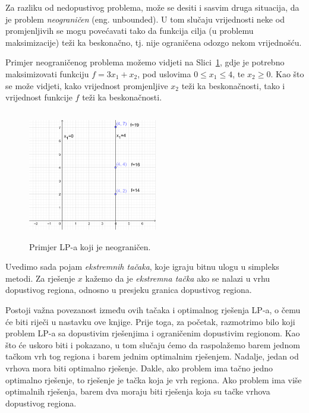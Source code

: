 \documentclass[a4paper, utf8, 11pt, colorlinks]{book}
\theoremstyle{definition}
\begin{document}
 Za razliku od nedopustivog problema, može se desiti i sasvim druga situacija, da je problem \emph{neograničen} (eng. unbounded). U tom slučaju vrijednosti neke od promjenljivih se mogu povećavati tako da funkcija cilja (u problemu maksimizacije) teži ka beskonačno, tj. nije ograničena odozgo nekom vrijednošću. %
 
 Primjer neograničenog problema možemo vidjeti na Slici~\ref{fig:unbounded_solution}, gdje je potrebno maksimizovati funkciju $f = 3 x_1 + x_2$, pod uslovima $0\leq x_1 \leq 4$, te $x_2 \geq 0$. Kao što se može vidjeti,  kako vrijednost promjenljive $x_2$ teži ka beskonačnosti, tako i vrijednost funkcije $f$ teži ka beskonačnosti.
 
  \begin{figure}
     \centering
     \includegraphics[width=160pt, height=160pt]{fig4.eps}
     \caption{Primjer LP-a koji je neograničen.}
     \label{fig:unbounded_solution}
 \end{figure}
 
Uvedimo sada pojam \emph{ekstremnih tačaka}, koje igraju bitnu ulogu u simpleks metodi. Za rješenje $x$ kažemo da je \emph{ekstremna tačka} ako se nalazi u vrhu dopustivog regiona, odnosno u presjeku granica dopustivog regiona.

Postoji važna povezanost između ovih tačaka i optimalnog rješenja LP-a, o čemu će biti riječi u nastavku ove knjige.
Prije toga, za početak, razmotrimo bilo koji problem LP-a sa dopustivim rješenjima i ograničenim dopustivim regionom. Kao što će uskoro biti i pokazano, u tom slučaju ćemo da raspolažemo barem jednom tačkom vrh tog regiona i barem jednim optimalnim rješenjem. Nadalje, jedan od vrhova mora biti optimalno rješenje. Dakle, ako problem ima tačno jedno optimalno rješenje, to rješenje je tačka koja je vrh regiona. Ako problem ima više optimalnih rješenja, barem dva moraju biti rješenja koja su tačke  vrhova dopustivog regiona.
\end{document}
